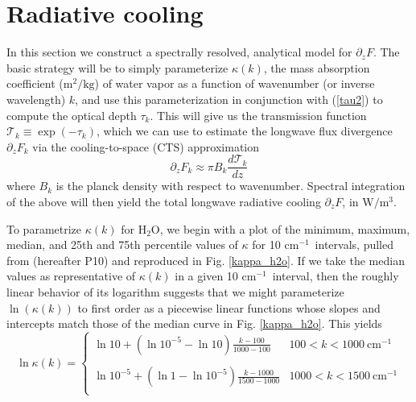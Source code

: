 \documentclass[10pt]{article}
\newcommand{\beqn}{\begin{equation}}
\newcommand{\eeqn}{\end{equation}}
\newcommand{\eqnref}[1]{(\ref{#1})}
\newcommand{\ppz}{\ensuremath{\partial_z}}
\newcommand{\htwo}{\ensuremath{\mathrm{H_2O}}}
\newcommand{\FLW}{\ensuremath{F}}
\newcommand{\trans}{\ensuremath{\mathcal{T}}}
\newcommand{\cminverse}{\ensuremath{\mathrm{cm^{-1}}}}
\newcommand{\pierre}{P10}
\begin{document}
\section{Radiative cooling}
In this section we construct a spectrally resolved, analytical model for $\ppz F$. The basic strategy will be to  simply parameterize $\kappa(k)$, the mass absorption coefficient ($\mathrm{m^2/kg}$) of water vapor as a function of wavenumber (or inverse wavelength) $k$, and use this parameterization in conjunction with \eqnref{tau2} to compute the optical depth $\tau_k$. This will give us the transmission function $\trans_k \equiv \exp(-\tau_k)$, which we can use to estimate the longwave flux divergence $\ppz \FLW_k$ via the cooling-to-space (CTS) approximation
	\beqn
		\ppz \FLW_k \approx \pi B_k \frac{d \trans_k}{dz} 
	\label{cts}
	\eeqn
where $B_k$ is the planck density with respect to wavenumber. Spectral integration of the above will then yield the total longwave radiative cooling $\ppz \FLW$, in $\mathrm{W/m^3}$.

To parametrize $\kappa(k)$ for \htwo, we begin with a plot of the minimum, maximum, median, and 25th and 75th percentile values of $\kappa$ for 10 \cminverse\ intervals, pulled from \cite{pierrehumbert2010} (hereafter \pierre) and reproduced in Fig. \ref{kappa_h2o}.  If we take the median values as representative of $\kappa(k)$ in a given 10 \cminverse\ interval, then the roughly
linear behavior of its logarithm suggests that we might parameterize $\ln(\kappa(k))$  to first order as a piecewise linear functions whose slopes and intercepts match those of the median curve in Fig. \ref{kappa_h2o}. This yields
\beqn
	\ln \kappa(k) = \left\{ \begin{array}{lc}
						\ln 10 + (\ln 10^{-5} -\ln 10)\frac{k-100}{1000-100} & 100 < k < 1000 \ \cminverse \\
							& \\
						\ln 10^{-5} + (\ln 1 -\ln 10^{-5})\frac{k-1000}{1500-1000} & 1000 < k < 1500 \ \cminverse \\
					\end{array} \right.								
\label{kappa_param}
\eeqn
\end{document}
